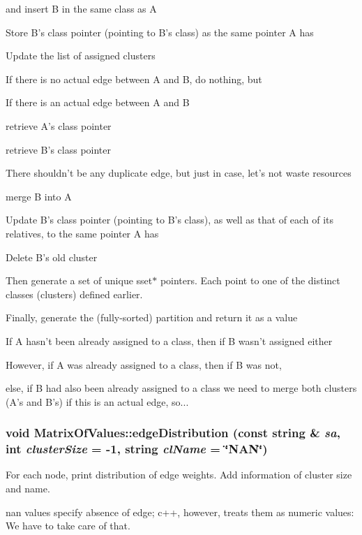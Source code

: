 and insert B in the same class as A 

Store B's class pointer (pointing to B's class) as the same pointer A has

Update the list of assigned clusters

If there is no actual edge between A and B, do nothing, but

If there is an actual edge between A and B

retrieve A's class pointer

retrieve B's class pointer

There shouldn't be any duplicate edge, but just in case, let's not waste resources

merge B into A

Update B's class pointer (pointing to B's class), as well as that of each of its relatives, to the same pointer A has

Delete B's old cluster

Then generate a set of unique sset$\ast$ pointers. Each point to one of the distinct classes (clusters) defined earlier.

Finally, generate the (fully-sorted) partition and return it as a value

If A hasn't been already assigned to a class, then if B wasn't assigned either

However, if A was already assigned to a class, then if B was not,

else, if B had also been already assigned to a class we need to merge both clusters (A's and B's) if this is an actual edge, so...
\subsubsection{\setlength{\rightskip}{0pt plus 5cm}void Matrix\-Of\-Values::edge\-Distribution (const string \& {\em sa}, int {\em cluster\-Size} = -1, string {\em cl\-Name} = \char`\"{}NAN\char`\"{})}\label{classMatrixOfValues_a27}


For each node, print distribution of edge weights. Add information of cluster size and name. 

nan values specify absence of edge; c++, however, treats them as numeric values: We have to take care of that. 
